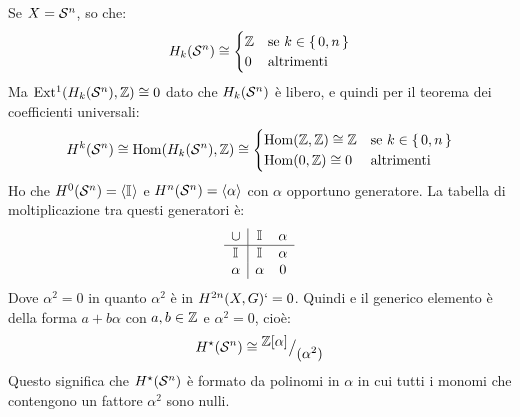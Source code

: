 \begin{example}
  Se $ X = \mathcal{S}^{n} $, so che:
  \[
    H_k(\mathcal{S}^{n}) \cong
    \begin{cases}
      \mathbb{Z} & \text{se } k \in \set{0,n} \\
      0 & \text{altrimenti}
    \end{cases}
  \]
  Ma $ \mathrm{Ext^1}( H_k(\mathcal{S}^{n}), \mathbb{Z}) \cong 0 $ dato che $ H_k(\mathcal{S}^{n}) $ è libero, e quindi
  per il teorema dei coefficienti universali:
  \[
    H^k(\mathcal{S}^{n}) \cong \mathrm{Hom}( H_k(\mathcal{S}^{n}), \mathbb{Z}) \cong
    \begin{cases}
      \mathrm{Hom}( \mathbb{Z}, \mathbb{Z}) \cong \mathbb{Z} & \text{se } k \in \set{0,n} \\
      \mathrm{Hom}( 0, \mathbb{Z}) \cong 0 & \text{altrimenti}
    \end{cases}
  \]
  Ho che $ H^0(\mathcal{S}^{n}) = \langle\mathbb{I}_{}\rangle $ e $ H^n(\mathcal{S}^{n}) = \langle\alpha\rangle $ con $ \alpha $ opportuno
  generatore. La tabella di moltiplicazione tra questi generatori è:
  \[
    \begin{array}{c|cc}
      \cup & \mathbb{I}_{} & \alpha \\ \hline
      \mathbb{I}_{} & \mathbb{I}_{} & \alpha \\
      \alpha  & \alpha & 0 \\
    \end{array}
  \]
  Dove $ \alpha^2 = 0 $ in quanto $ \alpha^2 $ è in $ H^{2n}(X, G) `= 0 $. Quindi e il
  generico elemento è della forma $ a + b \alpha $ con $ a,b \in \mathbb{Z} $ e
  $ \alpha^2 = 0 $, cioè:
  \[
    H^\star(\mathcal{S}^{n}) \cong {^{\textstyle \mathbb{Z}[\alpha]}\big/_{\textstyle (\alpha^2)}}
  \]
  Questo significa che $ H^\star(\mathcal{S}^{n}) $ è formato da polinomi in $ \alpha $ in cui
  tutti i monomi che contengono un fattore $ \alpha^2 $ sono nulli.
\end{example}
